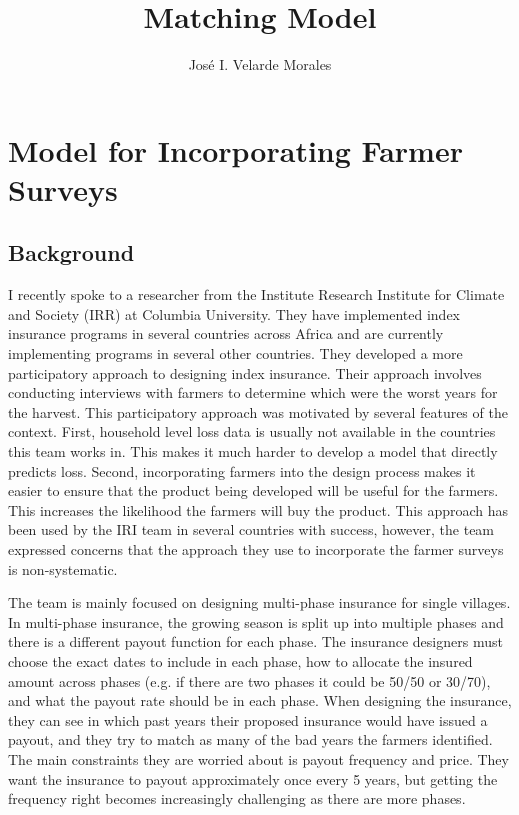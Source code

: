 \documentclass[11pt]{article}
\title{Matching Model}
\author{José I. Velarde Morales}
\begin{document}
\maketitle

\section{Model for Incorporating Farmer Surveys} \label{limited-data}
  \subsection{Background}
    I recently spoke to a researcher from the Institute Research Institute for Climate and Society (IRR) at Columbia University. They have implemented index insurance programs in several countries across Africa and are currently implementing programs in several other countries. They developed a more participatory approach to designing index insurance. Their approach involves conducting interviews with farmers to determine which were the worst years for the harvest. This participatory approach was motivated by several features of the context. First, household level loss data is usually not available in the countries this team works in. This makes it much harder to develop a model that directly predicts loss. Second, incorporating farmers into the design process makes it easier to ensure that the product being developed will be useful for the farmers. This increases the likelihood the farmers will buy the product. This approach has been used by the IRI team in several countries with success, however, the team expressed concerns that the approach they use to incorporate the farmer surveys is non-systematic. 

    The team is mainly focused on designing multi-phase insurance for single villages. In multi-phase insurance, the growing season is split up into multiple phases and there is a different payout function for each phase. The insurance designers must choose the exact dates to include in each phase, how to allocate the insured amount across phases (e.g. if there are two phases it could be 50/50 or 30/70), and what the payout rate should be in each phase. When designing the insurance, they can see in which past years their proposed insurance would have issued a payout, and they try to match as many of the bad years the farmers identified. The main constraints they are worried about is payout frequency and price. They want the insurance to payout approximately once every 5 years, but getting the frequency right becomes increasingly challenging as there are more phases.  
\end{document}

